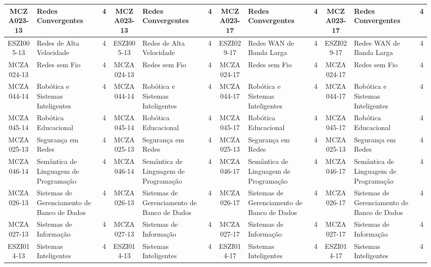 \begin{landscape}
{\begin{longtable}{|c|p{.2\textheight}|c||c|p{.2\textheight}|c||c|p{.2\textheight}|c||c|p{.2\textheight}|c|}
MCZA023-13 & Redes Convergentes & 4 &
MCZA023-13 & Redes Convergentes & 4 &
MCZA023-17 & Redes Convergentes & 4 &
MCZA023-17 & Redes Convergentes & 4\\ \hline

ESZI005-13 & Redes de Alta Velocidade & 4 &
ESZI005-13 & Redes de Alta Velocidade & 4 &
ESZI029-17 & Redes WAN de Banda Larga & 4 &
ESZI029-17 & Redes WAN de Banda Larga & 4\\ \hline

MCZA024-13 & Redes sem Fio & 4 &
MCZA024-13 & Redes sem Fio & 4 &
MCZA024-17 & Redes sem Fio & 4 &
MCZA024-17 & Redes sem Fio & 4\\ \hline

MCZA044-14 & Robótica e Sistemas Inteligentes & 4 &
MCZA044-14 & Robótica e Sistemas Inteligentes & 4 &
MCZA044-17 & Robótica e Sistemas Inteligentes & 4 &
MCZA044-17 & Robótica e Sistemas Inteligentes & 4\\ \hline

MCZA045-14 & Robótica Educacional & 4 &
MCZA045-14 & Robótica Educacional & 4 &
MCZA045-17 & Robótica Educacional & 4 &
MCZA045-17 & Robótica Educacional & 4\\ \hline

MCZA025-13 & Segurança em Redes & 4 &
MCZA025-13 & Segurança em Redes & 4 &
MCZA025-13 & Segurança em Redes & 4 & 
MCZA025-13 & Segurança em Redes & 4\\ \hline

MCZA046-14 & Semântica de Linguagem de Programação & 4 &
MCZA046-14 & Semântica de Linguagem de Programação & 4 &
MCZA046-17 & Semântica de Linguagem de Programação & 4 &
MCZA046-17 & Semântica de Linguagem de Programação & 4\\ \hline

MCZA026-13 & Sistemas de Gerenciamento de Banco de Dados & 4 &
MCZA026-13 & Sistemas de Gerenciamento de Banco de Dados & 4 &
MCZA026-17 & Sistemas de Gerenciamento de Banco de Dados & 4 & 
MCZA026-17 & Sistemas de Gerenciamento de Banco de Dados & 4\\ \hline

MCZA027-13 & Sistemas de Informação & 4 &
MCZA027-13 & Sistemas de Informação & 4 &
MCZA027-17 & Sistemas de Informação & 4 &
MCZA027-17 & Sistemas de Informação & 4\\ \hline

ESZI014-13 & Sistemas Inteligentes & 4 &
ESZI014-13 & Sistemas Inteligentes & 4 &
ESZI014-17 & Sistemas Inteligentes & 4 & 
ESZI014-17 & Sistemas Inteligentes & 4\\ \hline


\end{longtable}}
\end{landscape}
